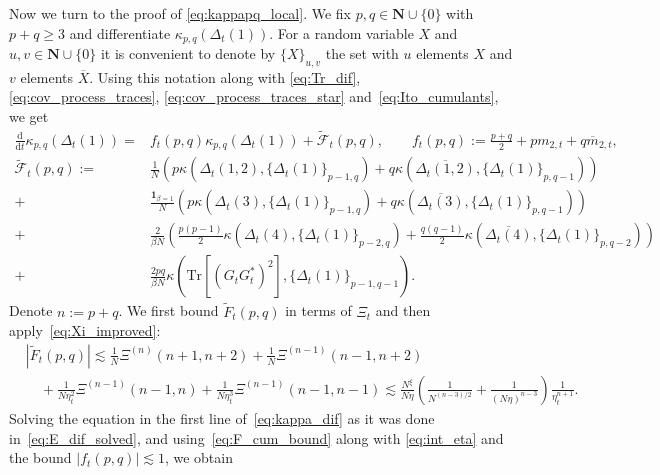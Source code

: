 \documentclass[10pt]{amsart}
\numberwithin{equation}{section}
\newcommand{\dif}{\mathrm{d}}
\newcommand{\N}{\mathbf{N}}
\newcommand{\Tr}{\mathrm{Tr}}
\begin{document}
Now we turn to the proof of \eqref{eq:kappapq_local}. We fix $p,q\in\N\cup\{0\}$ with $p+q\ge 3$ and differentiate $\kappa_{p,q}(\Delta_t(1))$. For a random variable $X$ and $u,v\in\N\cup\{0\}$ it is convenient to denote by $\{X\}_{u,v}$ the set with $u$ elements $X$ and $v$ elements $\overline{X}$. Using this notation along with \eqref{eq:Tr_dif}, \eqref{eq:cov_process_traces}, \eqref{eq:cov_process_traces_star} and~\eqref{eq:Ito_cumulants}, we get
\begin{equation}
\begin{split}
\frac{\dif}{\dif t} \kappa_{p,q}\left(\Delta_t(1)\right) =& f_t(p,q)\kappa_{p,q}(\Delta_t(1)) + \widetilde{\mathcal{F}}_t(p,q),\qquad f_t(p,q):=\frac{p+q}{2} + p m_{2,t} + q\overline{m}_{2,t},\\
\widetilde{\mathcal{F}}_t(p,q):= &\frac{1}{N}\left(p\kappa\left(\Delta_t(1,2),\{\Delta_t(1)\}_{p-1,q}\right) + q \kappa\left(\overline{\Delta_t(1,2)},\{\Delta_t(1)\}_{p,q-1}\right)\right)\\
+&\frac{\bm{1}_{\beta=1}}{N}\left(p\kappa\left(\Delta_t(3),\{\Delta_t(1)\}_{p-1,q}\right)+q\kappa\left(\overline{\Delta_t(3)},\{\Delta_t(1)\}_{p,q-1}\right)\right)\\
+&\frac{2}{\beta N}\left( \frac{p(p-1)}{2}\kappa\left( \Delta_t(4),\{\Delta_t(1)\}_{p-2,q}\right) + \frac{q(q-1)}{2}\kappa\left( \overline{\Delta_t(4)},\{\Delta_t(1)\}_{p,q-2}\right)  \right)\\
+& \frac{2pq}{\beta N} \kappa\left( \Tr\left[(G_tG^*_t)^2\right],\{\Delta_t(1)\}_{p-1,q-1}\right).
\end{split}
\label{eq:kappa_dif}
\end{equation}
Denote $n:=p+q$. We first bound $\widetilde{F}_t(p,q)$ in terms of $\Xi_t$ and then apply~\eqref{eq:Xi_improved}:
\begin{equation}
\begin{split}
&\left\vert\widetilde{F}_t(p,q)\right\vert \lesssim \frac{1}{N}\Xi^{(n)}\!(n+1,n+2) + \frac{1}{N}\Xi^{(n-1)}\!(n-1,n+2)\\
&\quad +\frac{1}{N\eta^2_t}\Xi^{(n-1)}\!(n-1,n) + \frac{1}{N\eta^3_t}\Xi^{(n-1)}\!(n-1,n-1)\lesssim  \frac{N^\xi}{N\eta}\left(\frac{1}{N^{(n-3)/2}} + \frac{1}{(N\eta)^{n-3}}\right)\frac{1}{\eta_t^{n+1}}. 
\end{split}
\label{eq:F_cum_bound}
\end{equation}
Solving the equation in the first line of~\eqref{eq:kappa_dif} as it was done in~\eqref{eq:E_dif_solved}, and using~\eqref{eq:F_cum_bound} along with \eqref{eq:int_eta} and the bound $|f_t(p,q)|\lesssim 1$, we obtain
\end{document}
